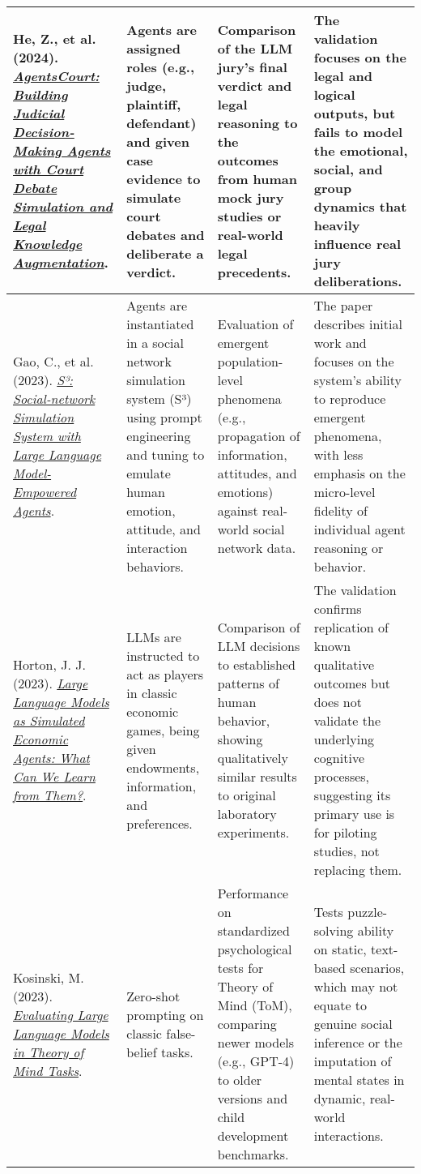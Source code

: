 {\begin{longtable}{| L{4.5cm} | L{3.5cm} | L{3.5cm} | L{3.5cm} |}
\\\hline
He, Z., et al. (2024). \href{https://arxiv.org/abs/2403.02959}{\textit{AgentsCourt: Building Judicial Decision-Making Agents with Court Debate Simulation and Legal Knowledge Augmentation}}. & Agents are assigned roles (e.g., judge, plaintiff, defendant) and given case evidence to simulate court debates and deliberate a verdict. & Comparison of the LLM jury's final verdict and legal reasoning to the outcomes from human mock jury studies or real-world legal precedents. & The validation focuses on the legal and logical outputs, but fails to model the emotional, social, and group dynamics that heavily influence real jury deliberations.
\\\hline
Gao, C., et al. (2023). \href{https://arxiv.org/abs/2307.14984}{\textit{S³: Social-network Simulation System with Large Language Model-Empowered Agents}}. & Agents are instantiated in a social network simulation system (S³) using prompt engineering and tuning to emulate human emotion, attitude, and interaction behaviors. & Evaluation of emergent population-level phenomena (e.g., propagation of information, attitudes, and emotions) against real-world social network data. & The paper describes initial work and focuses on the system's ability to reproduce emergent phenomena, with less emphasis on the micro-level fidelity of individual agent reasoning or behavior.
\\\hline
Horton, J. J. (2023). \href{https://www.nber.org/papers/w31122}{\textit{Large Language Models as Simulated Economic Agents: What Can We Learn from Them?}}. & LLMs are instructed to act as players in classic economic games, being given endowments, information, and preferences. & Comparison of LLM decisions to established patterns of human behavior, showing qualitatively similar results to original laboratory experiments. & The validation confirms replication of known qualitative outcomes but does not validate the underlying cognitive processes, suggesting its primary use is for piloting studies, not replacing them.
\\\hline
Kosinski, M. (2023). \href{https://arxiv.org/abs/2302.02083}{\textit{Evaluating Large Language Models in Theory of Mind Tasks}}. & Zero-shot prompting on classic false-belief tasks. & Performance on standardized psychological tests for Theory of Mind (ToM), comparing newer models (e.g., GPT-4) to older versions and child development benchmarks. & Tests puzzle-solving ability on static, text-based scenarios, which may not equate to genuine social inference or the imputation of mental states in dynamic, real-world interactions.

\end{longtable}}
